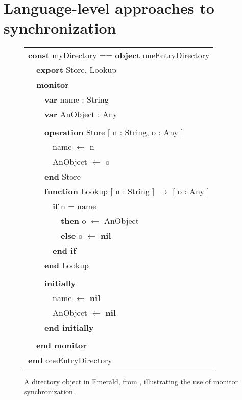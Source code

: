 \section{Language-level approaches to synchronization}
\begin{figure}
{\samepage\it\sis%
\begin{tabular}{l}%
{\bf const} myDirectory == {\bf object} oneEntryDirectory\\
~~{\bf export} Store, Lookup\\
~~{\bf monitor}\\
~~~~{\bf var} name : String\\
~~~~{\bf var} AnObject : Any\\
\\
~~~~{\bf operation} Store [ n : String, o : Any ]\\
~~~~~~name $\gets$ n\\
~~~~~~AnObject $\gets$ o\\
~~~~{\bf end} Store
\\
~~~~{\bf function} Lookup [ n : String ] $\to$ [ o : Any ]\\
~~~~~~{\bf if} n = name\\
~~~~~~~~{\bf then} o $\gets$ AnObject\\
~~~~~~~~{\bf else} o $\gets$ {\bf nil}\\
~~~~~~{\bf end if}\\
~~~~{\bf end} Lookup\\
\\
~~~~{\bf initially}\\
~~~~~~name $\gets$ {\bf nil}\\
~~~~~~AnObject $\gets$ {\bf nil}\\
~~~~{\bf end initially}\\
\\
~~{\bf end monitor}\\
{\bf end} oneEntryDirectory
\end{tabular}
}
\caption[A directory object in Emerald, illustrating the use of
 monitor synchronization.]
 {A directory object in Emerald, from \cite{BlackHuJuLe86},
  illustrating the use of monitor synchronization.}
\label{fig:emerald-dir}
\end{figure}

